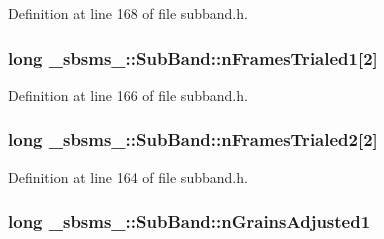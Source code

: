 Definition at line 168 of file subband.\+h.

\subsubsection[{\texorpdfstring{n\+Frames\+Trialed1}{nFramesTrialed1}}]{\setlength{\rightskip}{0pt plus 5cm}long \+\_\+sbsms\+\_\+\+::\+Sub\+Band\+::n\+Frames\+Trialed1\mbox{[}2\mbox{]}\hspace{0.3cm}{\ttfamily [protected]}}\hypertarget{class__sbsms___1_1_sub_band_a14e2c2793178a0c2ede77a2950a91cda}{}\label{class__sbsms___1_1_sub_band_a14e2c2793178a0c2ede77a2950a91cda}


Definition at line 166 of file subband.\+h.

\subsubsection[{\texorpdfstring{n\+Frames\+Trialed2}{nFramesTrialed2}}]{\setlength{\rightskip}{0pt plus 5cm}long \+\_\+sbsms\+\_\+\+::\+Sub\+Band\+::n\+Frames\+Trialed2\mbox{[}2\mbox{]}\hspace{0.3cm}{\ttfamily [protected]}}\hypertarget{class__sbsms___1_1_sub_band_adea573ff580db047a12746b977185636}{}\label{class__sbsms___1_1_sub_band_adea573ff580db047a12746b977185636}


Definition at line 164 of file subband.\+h.

\subsubsection[{\texorpdfstring{n\+Grains\+Adjusted1}{nGrainsAdjusted1}}]{\setlength{\rightskip}{0pt plus 5cm}long \+\_\+sbsms\+\_\+\+::\+Sub\+Band\+::n\+Grains\+Adjusted1\hspace{0.3cm}{\ttfamily [protected]}}\hypertarget{class__sbsms___1_1_sub_band_abcad7665d8bb743805b8ec7650ef4410}{}\label{class__sbsms___1_1_sub_band_abcad7665d8bb743805b8ec7650ef4410}


